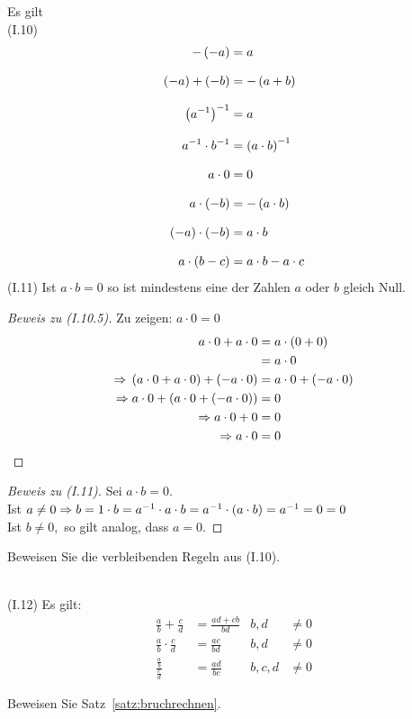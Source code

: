 \begin{satz}
    Es gilt\\
    (I.10)
    \begin{align}
        -\left(-a\right) &= a\\[8pt]
        \left(-a\right) + \left(-b\right) &= -\left(a+b\right)\\[8pt]
        \left(a^{-1}\right)^{-1} &= a\\[8pt]
        a^{-1}\cdot b^{-1} &= \left(a\cdot b\right)^{-1}\\[8pt]
        a\cdot 0 &= 0\\[8pt]
        a\cdot\left(-b\right) &= -\left(a\cdot b\right)\\[8pt]
        (-a)\cdot(-b) &= a\cdot b\\[8pt]
        a\cdot\left(b-c\right) &= a\cdot b - a\cdot c
    \end{align}
    \noindent (I.11) Ist $a\cdot b = 0$ so ist mindestens eine der Zahlen $a$ oder $b$ gleich Null.

    \begin{proof}[Beweis zu (I.10.5)]
        Zu zeigen: $a \cdot 0 = 0$
        \begin{align*}
            a\cdot 0 + a \cdot 0 &= a \cdot\left(0+0\right)\\
            &= a \cdot 0\\
            \Rightarrow{} \left(a\cdot 0 + a \cdot 0\right) + \left(-a \cdot 0\right) &= a \cdot 0 + \left(-a\cdot 0\right)\\
            \Rightarrow{} a \cdot 0 + \left(a\cdot 0 + \left(-a\cdot 0\right)\right) &= 0\\
            \Rightarrow{} a\cdot 0 +0 &= 0\\
            \Rightarrow{} a\cdot 0 &= 0\qedhere
        \end{align*}
    \end{proof}
    \begin{proof}[Beweis zu (I.11)]
        Sei $a\cdot b = 0$.\\
        Ist $a\neq 0 \Rightarrow{} b = 1\cdot b = a^{-1}\cdot a \cdot b = a^{-1}\cdot (a\cdot b) = a^{-1} = 0 = 0$\\
        Ist $b\neq 0,$ so gilt analog, dass $a = 0$.
    \end{proof}
    \begin{uebung}
        Beweisen Sie die verbleibenden Regeln aus (I.10).
    \end{uebung}
\end{satz}

\begin{satz}
    \label{satz:bruchrechnen}
    ~\\(I.12) Es gilt:
    \setcounter{equation}{0}
    \begin{align}
        \frac{a}{b} + \frac{c}{d} &= \frac{ad+cb}{bd} &b,d&\neq 0\\[10pt]
        \frac{a}{b} \cdot \frac{c}{d} &= \frac{ac}{bd} &b,d&\neq 0\\[10pt]
        \frac{\frac{a}{b}}{\frac{c}{d}} &= \frac{ad}{bc} &b,c,d&\neq 0
    \end{align}
    \begin{uebung}
        Beweisen Sie Satz~\ref{satz:bruchrechnen}.
    \end{uebung}
\end{satz}

